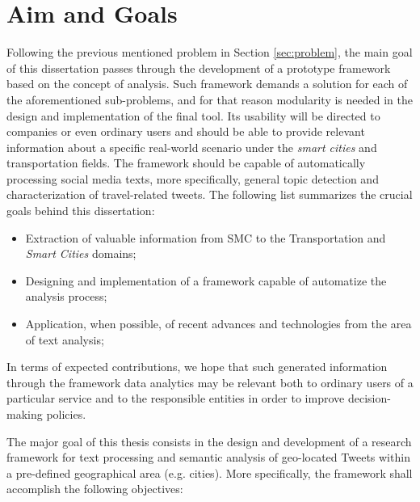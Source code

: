 \section{Aim and Goals}\label{sec:aim_goals}
Following the previous mentioned problem in Section \ref{sec:problem}, the main goal of this dissertation passes through the development of a prototype framework based on the concept of analysis. Such framework demands a solution for each of the aforementioned sub-problems, and for that reason modularity is needed in the design and implementation of the final tool. Its usability will be directed to companies or even ordinary users and should be able to provide relevant information about a specific real-world scenario under the \textit{smart cities} and transportation fields. The framework should be capable of automatically processing social media texts, more specifically, general topic detection and characterization of travel-related tweets. The following list summarizes the crucial goals behind this dissertation:

\begin{itemize}
	\item Extraction of valuable information from \gls{SMC} to the Transportation and \textit{Smart Cities} domains;
	\item Designing and implementation of a framework capable of automatize the analysis process;
	\item Application, when possible, of recent advances and technologies from the area of text analysis;
\end{itemize}

\medskip

In terms of expected contributions, we hope that such generated information through the framework data analytics may be relevant both to ordinary users of a particular service and to the responsible entities in order to improve decision-making policies.

The major goal of this thesis consists in the design and development of a research framework for text processing and semantic analysis of geo-located Tweets within a pre-defined geographical area (e.g. cities). More specifically, the framework shall accomplish the following objectives:

